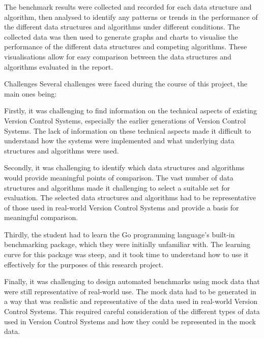\documentclass[a4paper,12pt]{article}
\makeatletter
\renewcommand{\section}{\needspace{.25\textheight} \@startsection{section}{1}{0mm}
  {\baselineskip}
  {\baselineskip}{\Large\bfseries\scshape}}
\makeatother
\begin{document}
The benchmark results were collected and recorded for each data structure and algorithm, then analysed to identify any patterns or trends in the performance of the different data structures and algorithms under different conditions. The collected data was then used to generate graphs and charts to visualise the performance of the different data structures and competing algorithms. These visualisations allow for easy comparison between the data structures and algorithms evaluated in the report.

\section{Challenges}
Several challenges were faced during the course of this project, the main ones being:

Firstly, it was challenging to find information on the technical aspects of existing Version Control Systems, especially the earlier generations of Version Control Systems. The lack of information on these technical aspects made it difficult to understand how the systems were implemented and what underlying data structures and algorithms were used.
\vspace{9pt}

Secondly, it was challenging to identify which data structures and algorithms would provide meaningful points of comparison. The vast number of data structures and algorithms made it challenging to select a suitable set for evaluation. The selected data structures and algorithms had to be representative of those used in real-world Version Control Systems and provide a basis for meaningful comparison.
\vspace{9pt}

Thirdly, the student had to learn the Go programming language's built-in benchmarking package, which they were initially unfamiliar with. The learning curve for this package was steep, and it took time to understand how to use it effectively for the purposes of this research project.
\vspace{9pt}

Finally, it was challenging to design automated benchmarks using mock data that were still representative of real-world use. The mock data had to be generated in a way that was realistic and representative of the data used in real-world Version Control Systems. This required careful consideration of the different types of data used in Version Control Systems and how they could be represented in the mock data.
\end{document}
